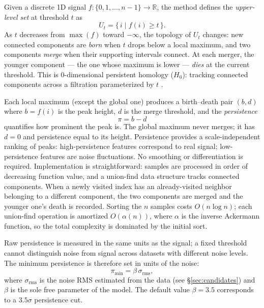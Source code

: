 \documentclass[twocolumn,twocolappendix,aj]{aastex631}
\newcommand{\srms}{\sigma_{\mathrm{rms}}}
\newcommand{\pmin}{\pi_{\mathrm{min}}}
\begin{document}
Given a discrete 1D signal $f : \{0, 1, \ldots, n{-}1\} \to \mathbb{R}$, the method
defines the \emph{upper-level set} at threshold $t$ as
\begin{equation}
  U_t = \bigl\{\, i \;\big|\; f(i) \geq t \,\bigr\}.
\end{equation}
As $t$ decreases from $\max(f)$ toward $-\infty$, the topology of $U_t$
changes: new connected components are \emph{born} when $t$ drops below a
local maximum, and two components \emph{merge} when their supporting
intervals connect.  At each merger, the younger component --- the one whose
maximum is lower --- \emph{dies} at the current threshold.  This is
0-dimensional persistent homology ($H_0$): tracking connected components
across a filtration parameterized by $t$
\citep{Edelsbrunner2002,Edelsbrunner2008,Bonis2016}.

Each local maximum (except the global one) produces a birth--death pair
$(b, d)$ where $b = f(i)$ is the peak height, $d$ is the merge threshold,
and the \emph{persistence}
\begin{equation}\label{eq:persistence}
  \pi = b - d
\end{equation}
quantifies how prominent the peak is.  The global maximum never merges; it
has $d = 0$ and persistence equal to its height.  Persistence provides a
scale-independent ranking of peaks: high-persistence features correspond to
real signal; low-persistence features are noise fluctuations.  No smoothing
or differentiation is required.
Implementation is straightforward: samples are processed in order of
decreasing function value, and a union-find data structure tracks connected
components.  When a newly visited index has an already-visited neighbor
belonging to a different component, the two components are merged and the
younger one's death is recorded.  Sorting the $n$ samples costs
$O(n \log n)$; each union-find operation is amortized $O(\alpha(n))$, where
$\alpha$ is the inverse Ackermann function, so the total complexity is
dominated by the initial sort.

Raw persistence is measured in the same units as the signal; a fixed
threshold cannot distinguish noise from signal across datasets with different
noise levels.  The minimum persistence is therefore set in units of the
noise:
\begin{equation}\label{eq:threshold}
  \pmin = \beta\,\srms,
\end{equation}
where $\srms$ is the noise RMS estimated from the data (see
\S\ref{sec:candidates}) and $\beta$ is the sole free parameter of the model.
The default value $\beta = 3.5$ corresponds to a $3.5\sigma$ persistence cut.
\end{document}
